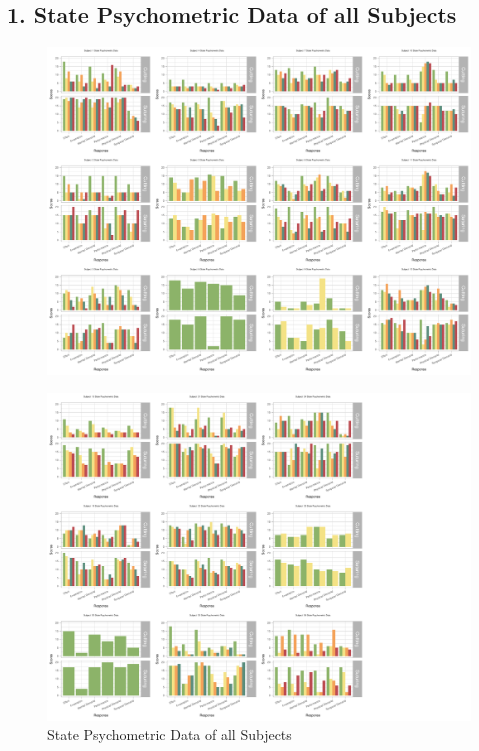 \documentclass[12pt,epsf]{report}
\begin{document}
{\subsection*{1. State Psychometric Data of all Subjects}
\begin{figure}[!htb]
	\centering
	\includegraphics[width=1.0\textwidth]{Q3-1-labels.pdf}
	\centering
\end{figure}
\begin{figure}[!htb]
	\centering
	\includegraphics[width=1.0\textwidth]{Q3-2-labels.pdf}
	\caption{State Psychometric Data of all Subjects}
	\centering
\end{figure}
\FloatBarrier
}
\end{document}
